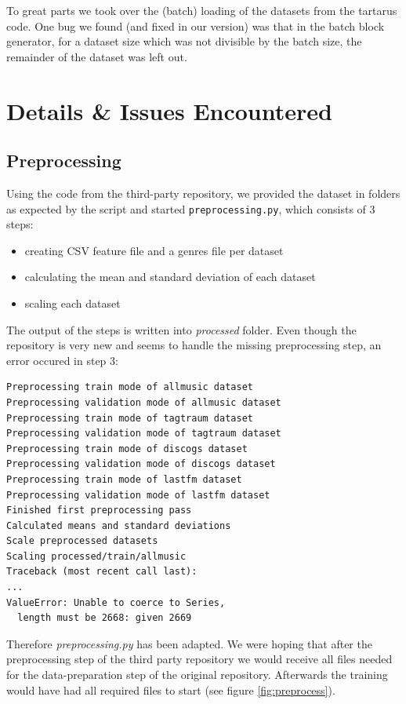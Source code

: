 \documentclass[sigconf,nonacm]{acmart}
\begin{document}
To great parts we took over the (batch) loading of the datasets from the tartarus code.
One bug we found (and fixed in our version) was that in the batch block generator, for a dataset size 
which was not divisible by the batch size, the remainder of the dataset was left out.

\section{Details \& Issues Encountered}

\subsection{Preprocessing}

Using the code from the third-party repository,
we provided the dataset in folders as expected by the script
and started \texttt{preprocessing.py},
which consists of 3 steps:
\begin{itemize}
  \item creating CSV feature file and a genres file per dataset
  \item calculating the mean and standard deviation of each dataset
  \item scaling each dataset
\end{itemize}
The output of the steps is written into \textit{processed} folder.
Even though the repository is very new and seems to handle the missing preprocessing step, an error occured in step 3:

\begin{lstlisting}
Preprocessing train mode of allmusic dataset
Preprocessing validation mode of allmusic dataset
Preprocessing train mode of tagtraum dataset
Preprocessing validation mode of tagtraum dataset
Preprocessing train mode of discogs dataset
Preprocessing validation mode of discogs dataset
Preprocessing train mode of lastfm dataset
Preprocessing validation mode of lastfm dataset
Finished first preprocessing pass
Calculated means and standard deviations
Scale preprocessed datasets
Scaling processed/train/allmusic
Traceback (most recent call last):
...
ValueError: Unable to coerce to Series, 
  length must be 2668: given 2669
\end{lstlisting}

Therefore \textit{preprocessing.py} has been adapted.
We were hoping that after the preprocessing step
of the third party repository we would receive all files needed
for the data-preparation step of the original repository.
Afterwards the training would have had all required files
to start (see figure \ref{fig:preprocess}).
\end{document}
